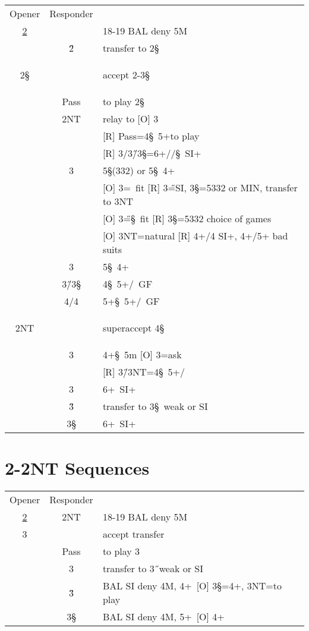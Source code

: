 \begin{longtable}{C{\bidlength} C{\bidlength} | l}
Opener & Responder \\
\hyperlink{2d}{2\D} & & 18-19 BAL deny 5M \\
& 2\H & transfer to 2\S \\
\hline
\hline
\hypertarget{2d2h2s}{}
2\S & & accept 2-3\S \\
& Pass& to play 2\S \\
& 2NT & relay to [O] 3\C \\
&     & [R] Pass=4\S\ 5+\C to play \\
&     & [R] 3\D/3\H/3\S=6+\D/\C/\S\ SI+ \\
& 3\C & 5\S(332) or 5\S\ 4+\D \\
&     & [O] 3\D=\D\ fit [R] 3\H=SI, 3\S=5332 or MIN, transfer to 3NT \\
&     & [O] 3\H=\S\ fit [R] 3\S=5332 choice of games \\
&     & [O] 3NT=natural [R] 4+/4 SI+, 4+/5+ bad suits \\
& 3\D & 5\S\ 4+\C \\
& 3\H/3\S & 4\S\ 5+\C/\D\ GF \\
& 4\C/4\D & 5+\S\ 5+\C/\D\ GF \\
\hline
\hypertarget{2d2h2n}{}
2NT &      & superaccept 4\S \\
& 3\C & 4+\S\ 5m [O] 3\D=ask \\
&     & [R] 3\H/3NT=4\S\ 5+\C/\D \\
& 3\D & 6+\D\ SI+ \\
& 3\H & transfer to 3\S\ weak or SI \\
& 3\S & 6+\C\ SI+ \\
\end{longtable}



\section{2\D-2NT Sequences}

\hypertarget{2d2n3c}{}
\begin{longtable}{C{\bidlength} C{\bidlength} | l}
Opener & Responder \\
\hyperlink{2d}{2\D} & 2NT  & 18-19 BAL deny 5M \\
3\C &      & accept transfer \\
\hline
& Pass& to play 3\C \\
& 3\D & transfer to 3\H\ weak or SI \\
& 3\H & BAL SI deny 4M, 4+\C\ [O] 3\S=4+\D, 3NT=to play \\
& 3\S & BAL SI deny 4M, 5+\D\ [O] 4+\C \\
\end{longtable}

